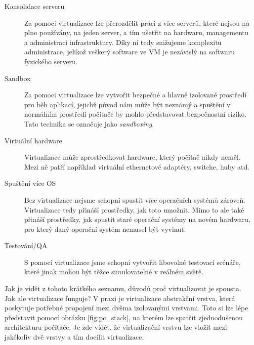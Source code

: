 \begin{description}
    \item[Konsolidace serveru] Za pomoci virtualizace lze přerozdělit práci z více serverů, které nejsou na plno používány, na jeden server, a tím ušetřit na hardwaru, managementu a administraci infrastruktury. Díky ní tedy snižujeme komplexitu administrace, jelikož veškerý software ve VM je nezávislý na softwaru fyzického serveru.\,\cite{chiueh2005survey}
    \item[Sandbox] Za pomoci virtualizace lze vytvořit bezpečné a hlavně izolované prostředí pro běh aplikací, jejichž původ nám může být neznámý a spuštění v normálním prostředí počítače by mohlo představovat bezpečnostní riziko. Tato technika se označuje jako \textit{sandboxing}.\,\cite{chiueh2005survey}
    \item[Virtuální hardware] Virtualizace může zprostředkovat hardware, který počítač nikdy neměl. Mezi ně patří například virtuální ethernetové adaptéry, switche, huby atd.\,\cite{chiueh2005survey}
    \item[Spuštění více OS] Bez virtualizace nejsme schopni spustit více operačních systémů zároveň. Virtualizace tedy přináší prostředky, jak toto umožnit. Mimo to ale také přináší prostředky, jak spustit staré operační systémy na novém hardwaru, pro který daný operační systém nemusel být vyvinut.\,\cite{chiueh2005survey}
    \item[Testování/QA] S pomocí virtualizace jsme schopni vytvořit libovolné testovací scénáře, které jinak mohou být těžce simulovatelné v reálném světě.\,\cite{chiueh2005survey}
\end{description}

Jak je vidět z tohoto krátkého seznamu, důvodů proč virtualizovat je spousta. Jak ale virtualizace funguje? V praxi je virtualizace abstrakční vrstva, která poskytuje potřebné propojení mezi dvěma izolovanými vrstvami. Toto si lze lépe představit pomocí obrázku \ref{fig:pc_stack}, na kterém lze spatřit zjednodušenou architekturu počítače. Je zde vidět, že virtualizační vrstvu lze vložit mezi jakékoliv dvě vrstvy a tím docílit virtualizace.\,\cite{chiueh2005survey}

